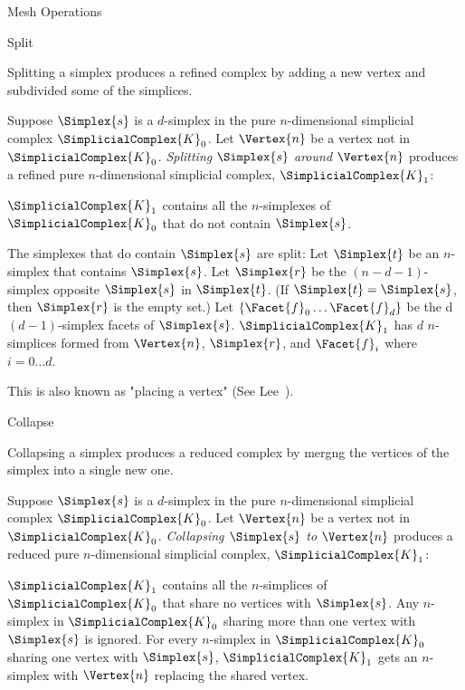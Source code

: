 \begin{plSection}{Mesh Operations}
\label{sec:mesh-operations}

\begin{plSection}{Split}

Splitting a simplex produces a refined complex by adding a new vertex
and subdivided some of the simplices.


Suppose $\Simplex{s}$ is a $d$-simplex
in the pure $n$-dimensional simplicial complex $\SimplicialComplex{K}_0$.
Let $\Vertex{n}$ be a vertex not in $\SimplicialComplex{K}_0$.
{\it Splitting $\Simplex{s}$ around $\Vertex{n}$}
produces a refined pure $n$-dimensional simplicial complex, $\SimplicialComplex{K}_1$:

$\SimplicialComplex{K}_1$ contains all the  $n$-simplexes of $\SimplicialComplex{K}_0$
that do not contain $\Simplex{s}$.

The simplexes that do contain $\Simplex{s}$ are split:
Let $\Simplex{t}$ be an $n$-simplex that contains $\Simplex{s}$.
Let $\Simplex{r}$ be the $(n-d-1)$-simplex opposite $\Simplex{s}$
in $\Simplex{t}$.
(If $\Simplex{t} = \Simplex{s}$, then $\Simplex{r}$ is the empty set.)
Let $\{ \Facet{f}_0 \ldots \Facet{f}_d \}$ be the
d $(d-1)$-simplex facets of $\Simplex{s}$.
$\SimplicialComplex{K}_1$ has
$d$ $n$-simplices formed from
$\Vertex{n}$, $\Simplex{r}$, and
$\Facet{f}_i$ where $i=0 \ldots d$.

This is also known as "placing a vertex" 
(See Lee~\cite[sec.~17.2]{Lee:2004:Subdivisions}).

\end{plSection}%

\begin{plSection}{Collapse}

Collapsing a simplex produces a reduced complex by mergng
the vertices of the simplex into a single new one.

Suppose $\Simplex{s}$ is a $d$-simplex
in the pure $n$-dimensional simplicial complex $\SimplicialComplex{K}_0$.
Let $\Vertex{n}$ be a vertex not in $\SimplicialComplex{K}_0$.
{\it Collapsing $\Simplex{s}$ to $\Vertex{n}$}
produces a reduced pure $n$-dimensional simplicial complex, $\SimplicialComplex{K}_1$:

$\SimplicialComplex{K}_1$ contains all the
$n$-simplices of $\SimplicialComplex{K}_0$ that share no vertices with $\Simplex{s}$.
Any $n$-simplex in $\SimplicialComplex{K}_0$ sharing more than one vertex
with $\Simplex{s}$ is ignored.
For every $n$-simplex in $\SimplicialComplex{K}_0$ sharing one vertex with $\Simplex{s}$,
$\SimplicialComplex{K}_1$ gets an $n$-simplex with $\Vertex{n}$ replacing the
shared vertex.

\end{plSection}%

\end{plSection}%
